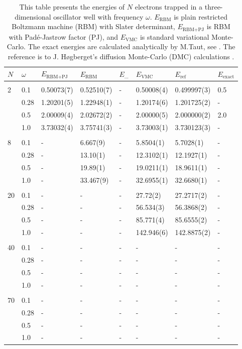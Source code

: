 \begin{table} [H]
	\caption{This table presents the energies of $N$ electrons trapped in a three-dimensional oscillator well with frequency $\omega$. $E_{\text{RBM}}$ is plain restricted Boltzmann machine (RBM) with Slater determinant, $E_{\text{RBM+PJ}}$ is RBM with Padé-Jastrow factor (PJ), and $E_{\text{VMC}}$ is standard variational Monte-Carlo. The exact energies are calculated analytically by M.Taut, see \cite{taut_two_1993}. The reference is to J. Høgberget's diffusion Monte-Carlo (DMC) calculations \cite{hogberget_quantum_2013}. } 
	\begin{tabularx}{\textwidth}{l:l|XXXXXX} \hline\hline
		\label{tab:quantumdotswinteraction3D}
		$N$ & $\omega$ & $E_{\text{RBM+PJ}}$ & $E_{\text{RBM}}$ & $E_{\text{...}}$ & $E_{\text{VMC}}$ & $E_{\text{ref}} $ & $E_{\text{exact}}$ \\ \hline \\
		2 & 0.1 & 0.50073(7) & 0.52510(7) & - & 0.50008(4) & 0.499997(3) & 0.5 \\
		& 0.28 & 1.20201(5) & 1.22948(1) & - & 1.20174(6) & 1.201725(2) & - \\
		& 0.5 & 2.00009(4) & 2.02672(2) & - & 2.00000(5) & 2.000000(2) & 2.0 \\
		& 1.0 & 3.73032(4) & 3.75741(3) & - & 3.73003(1) & 3.730123(3) & - \\ \hdashline \\
		
		8 & 0.1 & - & 6.667(9) & - & 5.8504(1) & 5.7028(1) & -\\ 
		& 0.28 & - & 13.10(1) & - & 12.3102(1) & 12.1927(1) & -\\
		& 0.5 & - & 19.89(1) & - & 19.0211(1) & 18.9611(1) & -\\
		& 1.0 & - & 33.467(9) & - & 32.6955(1) & 32.6680(1) & -\\ \hdashline \\
		
		20 & 0.1 & - & - & - & 27.72(2) & 27.2717(2) & -\\ 
		& 0.28 & - & - & - & 56.534(3) & 56.3868(2) & -\\
		& 0.5 & - & - & - & 85.771(4) & 85.6555(2) & -\\
		& 1.0 & - & - & - & 142.946(6) & 142.8875(2) & -\\ \hdashline \\
		
		40 & 0.1 & - & - & - & - & - & -\\ 
		& 0.28 & - & - & - & - & - & -\\
		& 0.5 & - & - & - & - & - & -\\
		& 1.0 & - & - & - & - & - & -\\ \hdashline \\
		
		70 & 0.1 & - & - & - & - & - & -\\ 
		& 0.28 & - & - & - & - & - & -\\
		& 0.5 & - & - & - & - & - & -\\
		& 1.0 & - & - & - & - & - & -\\ \hline\hline
	\end{tabularx}
\end{table}

